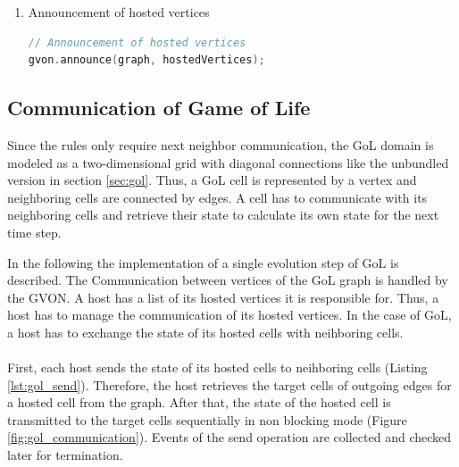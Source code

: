 \begin{enumerate}
\begin{enumerate}
\item Announcement of hosted vertices
  \begin{lstlisting}[language=C++, label=lst:gol_announce, caption={\ }]
// Announcement of hosted vertices
gvon.announce(graph, hostedVertices);
  \end{lstlisting}
  \end{enumerate}
\end{enumerate}

\subsection{Communication of Game of Life}
\label{sec:gol_imp}
Since the rules only require next neighbor communication, the GoL
domain is modeled as a two-dimensional grid with diagonal connections
like the unbundled version in section \ref{sec:gol}. Thus, a GoL cell
is represented by a vertex and neighboring cells are connected by
edges. A cell has to communicate with its neighboring cells and
retrieve their state to calculate its own state for the next time
step.

In the following the implementation of a single evolution step of GoL
is described. The Communication between vertices of the GoL graph
is handled by the GVON. A host has a list of its hosted vertices it is
responsible for. Thus, a host has to manage the communication of its
hosted vertices. In the case of GoL, a host has to exchange the state
of its hosted cells with neihboring cells.

\paragraph*{}
First, each host sends the state of its hosted cells to neihboring
cells (Listing \ref{lst:gol_send}). Therefore, the host retrieves the target cells of outgoing
edges for a hosted cell from the graph. After that, the state of the
hosted cell is transmitted to the target cells sequentially in non
blocking mode (Figure \ref{fig:gol_communication}). Events of the send
operation are collected and checked later for termination.

